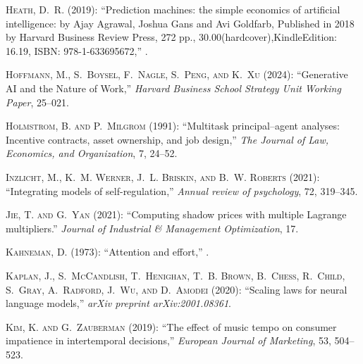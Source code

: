 \documentclass[11pt]{article}
\theoremstyle{definition}
\theoremstyle{remark}
\begin{document}
\begin{thebibliography}{70}
\textsc{Heath, D.~R.} (2019): \enquote{Prediction machines: the simple economics of artificial intelligence: by Ajay Agrawal, Joshua Gans and Avi Goldfarb, Published in 2018 by Harvard Business Review Press, 272 pp., 30.00(hardcover),KindleEdition: 16.19, ISBN: 978-1-633695672,} .

\textsc{Hoffmann, M., S.~Boysel, F.~Nagle, S.~Peng, and K.~Xu} (2024): \enquote{Generative AI and the Nature of Work,} \emph{Harvard Business School Strategy Unit Working Paper}, 25--021.

\textsc{Holmstrom, B. and P.~Milgrom} (1991): \enquote{Multitask principal--agent analyses: Incentive contracts, asset ownership, and job design,} \emph{The Journal of Law, Economics, and Organization}, 7, 24--52.

\textsc{Inzlicht, M., K.~M. Werner, J.~L. Briskin, and B.~W. Roberts} (2021): \enquote{Integrating models of self-regulation,} \emph{Annual review of psychology}, 72, 319--345.

\textsc{Jie, T. and G.~Yan} (2021): \enquote{Computing shadow prices with multiple Lagrange multipliers.} \emph{Journal of Industrial \& Management Optimization}, 17.

\textsc{Kahneman, D.} (1973): \enquote{Attention and effort,} .

\textsc{Kaplan, J., S.~McCandlish, T.~Henighan, T.~B. Brown, B.~Chess, R.~Child, S.~Gray, A.~Radford, J.~Wu, and D.~Amodei} (2020): \enquote{Scaling laws for neural language models,} \emph{arXiv preprint arXiv:2001.08361}.

\textsc{Kim, K. and G.~Zauberman} (2019): \enquote{The effect of music tempo on consumer impatience in intertemporal decisions,} \emph{European Journal of Marketing}, 53, 504--523.


\end{thebibliography}
\end{document}
